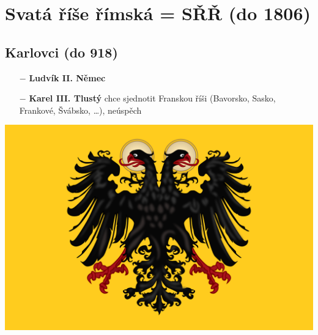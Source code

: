\documentclass{article}
\begin{document}
\section*{Svatá říše římská = SŘŘ (do 1806)}
\begin{minipage}{0.6\textwidth}
    \vspace{-3em}
    \subsection*{Karlovci (do 918)}
    \begin{itemize}
        \vspace{-0.5em}
        \setlength\itemsep{0.15em}
        \item[$-$] \textbf{Ludvík II. Němec}
        \item[$-$] \textbf{Karel III. Tlustý} chce sjednotit Franskou říši (Bavorsko, Sasko, Frankové, Švábsko, \dots), neúspěch
    \end{itemize}
\end{minipage}
\hfill
\noindent\begin{minipage}{0.3\textwidth}
    \vspace{-3.5em}
    \includegraphics[width=\linewidth]{vlajka.png}
\end{minipage}
\end{document}
